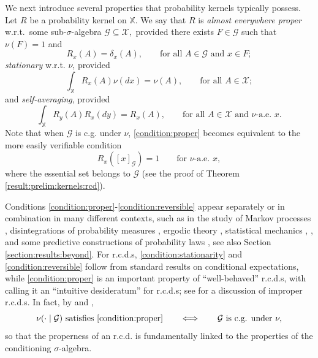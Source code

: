 \documentclass[a4paper]{article}
\theoremstyle{plain}
\theoremstyle{remark}
\theoremstyle{definition}
\begin{document}
We next introduce several properties that probability kernels typically possess. Let $R$ be a probability kernel on $\mathbb{X}$. We say that $R$ is \textit{almost everywhere proper} w.r.t.~some sub-$\sigma$-algebra $\mathcal{G}\subseteq\mathcal{X},$ provided there exists $F\in\mathcal{G}$ such that $\nu(F)=1$ and
\begin{equation}\label{condition:proper}\tag{$A$}
R_x(A)=\delta_x(A),\qquad\mbox{for all }A\in\mathcal{G}\mbox{ and }x\in F;
\end{equation}
\textit{stationary} w.r.t. $\nu$, provided
\begin{equation}\label{condition:stationarity}\tag{$B$}
\int_\mathbb{X}R_x(A)\nu(dx)=\nu(A),\qquad\mbox{for all }A\in\mathcal{X};
\end{equation}
and \textit{self-averaging}, provided
\begin{equation}\label{condition:reversible}\tag{$C$}
\int_\mathbb{X}R_y(A)R_x(dy)=R_x(A),\qquad\mbox{for all }A\in\mathcal{X}\mbox{ and }\nu\mbox{-a.e. }x.
\end{equation}
Note that when $\mathcal{G}$ is c.g. under $\nu$, \eqref{condition:proper} becomes equivalent to the more easily verifiable condition
\begin{equation}\label{condition:total}
R_x([x]_\mathcal{G})=1\qquad\mbox{for }\nu\mbox{-a.e. }x,
\end{equation}
where the essential set belongs to $\mathcal{G}$ (see the proof of Theorem \ref{result:prelim:kernels:rcd}).

Conditions \eqref{condition:proper}-\eqref{condition:reversible} appear separately or in combination in many different contexts, such as in the study of Markov processes \cite[Example 4]{berti2014}, disintegrations of probability measures \citep{berti1999}, ergodic theory \cite[Theorem 6.2]{einsielder2011}, statistical mechanics \cite[Section 2]{preston1976}, \cite[p.\,538]{sokal1981}, and some predictive constructions of probability laws \citep{berti2021}, see also Section \ref{section:results:beyond}. For r.c.d.s, \eqref{condition:stationarity} and \eqref{condition:reversible} follow from standard results on conditional expectations, while \eqref{condition:proper} is an important property of ``well-behaved'' r.c.d.s, with \cite{blackwell1975} calling it an ``intuitive desideratum'' for r.c.d.s; see \cite{berti2007,seidenfeld2001} for a discussion of improper r.c.d.s. In fact, by \cite[][Theorem 1]{blackwell1975} and \cite[][p.\,650]{berti2007},
\begin{equation}\label{condition:cg_under}
\nu(\cdot\mid\mathcal{G})\mbox{ satisfies }\eqref{condition:proper}\qquad\Longleftrightarrow\qquad\mathcal{G}\mbox{ is c.g. under }\nu,
\end{equation}
so that the properness of an r.c.d. is fundamentally linked to the properties of the conditioning $\sigma$-algebra.
\end{document}
